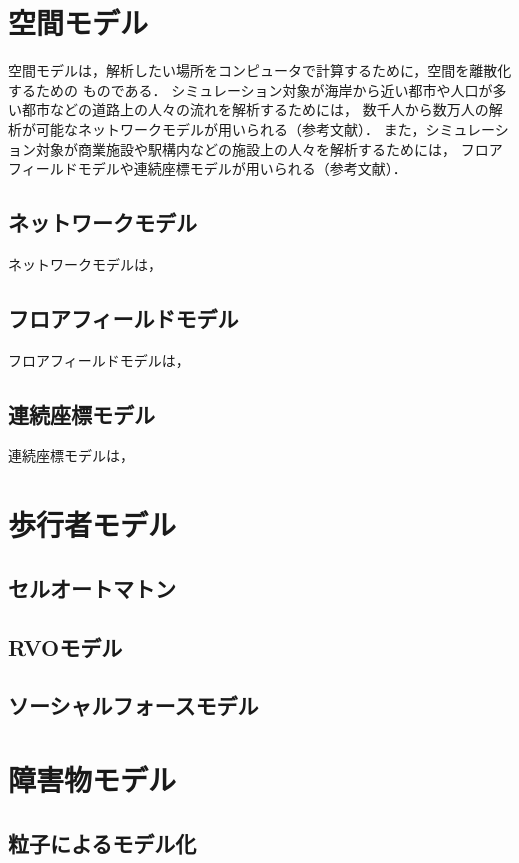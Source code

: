 \section{空間モデル}
空間モデルは，解析したい場所をコンピュータで計算するために，空間を離散化するための
ものである．
シミュレーション対象が海岸から近い都市や人口が多い都市などの道路上の人々の流れを解析するためには，
数千人から数万人の解析が可能なネットワークモデルが用いられる（参考文献）．
また，シミュレーション対象が商業施設や駅構内などの施設上の人々を解析するためには，
フロアフィールドモデルや連続座標モデルが用いられる（参考文献）．



\subsection{ネットワークモデル}
ネットワークモデルは，

\subsection{フロアフィールドモデル}
フロアフィールドモデルは，

\subsection{連続座標モデル}
連続座標モデルは，

\section{歩行者モデル}

\subsection{セルオートマトン}

\subsection{RVOモデル}

\subsection{ソーシャルフォースモデル}

\section{障害物モデル}

\subsection{粒子によるモデル化}

